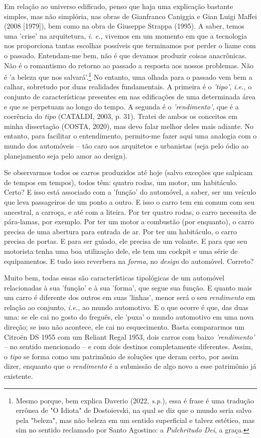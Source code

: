 \documentclass[]{report}
\begin{document}
	Em relação ao universo edificado, penso que haja uma explicação bastante simples, mas não simplória, nas obras de Gianfranco Caniggia e Gian Luigi Maffei (2008 [1979]), bem como na obra de Giuseppe Strappa (1995). A saber, temos uma 'crise' na arquitetura, \textit{i. e.,} vivemos em um momento em que a tecnologia nos proporciona tantas escolhas possíveis que terminamos por perder o liame com o passado. Entendam-me bem, não é que devamos produzir coisas anacrônicas. Não é o romantismo do retorno ao passado a resposta aos nossos problemas. Não é 'a beleza que nos salvará'.\footnote[3]{Mesmo porque, bem explica Daverio (2022, \textit{s.p.}), essa é frase é uma tradução errônea de "O Idiota" de Dostoievski, na qual se diz que o mundo seria salvo pela "beleza", mas não beleza em um sentido superficial e talvez estético, mas sim no sentido reclamado por Santo Agostino: a \textit{Pulchritudo Dei}, a graça.} No entanto, uma olhada para o passado vem bem a calhar, sobretudo por duas realidades fundamentais. A primeira é o \textit{'tipo'}, \textit{i.e.,} o conjunto de características presentes em nas edificações de uma determinada área e que se perpetuam ao longo do tempo. A segunda é o \textit{'rendimento'}, que é a coerência do \textit{tipo} (CATALDI, 2003, p. 31). Tratei de ambos os conceitos em minha dissertação (COSTA, 2020), mas devo falar melhor deles mais adiante. No entanto, para facilitar o entendimento, permito-me fazer aqui uma analogia com o mundo dos automóveis – tão caro aos arquitetos e urbanistas (seja pelo ódio ao planejamento seja pelo amor ao design). 
	
	Se observarmos todos os carros produzidos até hoje (salvo exceções que salpicam de tempos em tempos), todos têm: quatro rodas, um motor, um habitáculo. Certo? E isso está associado com a 'função' do automóvel, a saber, ser um veículo que leva passageiros de um ponto a outro. E isso o carro tem em comum com seu ancestral, a carroça, e até com a liteira. Por ter quatro rodas, o carro necessita de pára-lamas, por exemplo. Por ter um motor a combustão (por enquanto), o carro precisa de uma abertura para entrada de ar. Por ter um habitáculo, o carro precisa de portas. E para ser guiado, ele precisa de um volante. E para que seu motorista tenha uma boa utilização dele, ele tem um cockpit e uma série de equipamentos. E tudo isso reverbera na \textit{forma}, no \textit{design} do automóvel. Correto? 
	
	Muito bem, todas essas são características tipológicas de um automóvel relacionadas à sua 'função' e à sua 'forma', que segue sua função. E quanto mais um carro é diferente dos outros em suas 'linhas', menor será o seu \textit{rendimento} em relação ao conjunto, \textit{i.e.,} ao mundo automotivo. E o que ocorre é que, das duas uma: se ele cai no gosto do freguês, ele 'puxa' o mundo automotivo em uma nova direção; se isso não acontece, ele cai no esquecimento. Basta compararmos um Citroën DS 1955 com um Reliant Regal 1953, dois carros com baixo \textit{'rendimento'} – no sentido mencionado – e com dois destinos completamente diferentes. Assim, o \textit{tipo} se forma como um patrimônio de soluções que deram certo, por assim dizer, enquanto que o \textit{rendimento} é a submissão de algo novo a esse patrimônio já existente.
	
\end{document}
